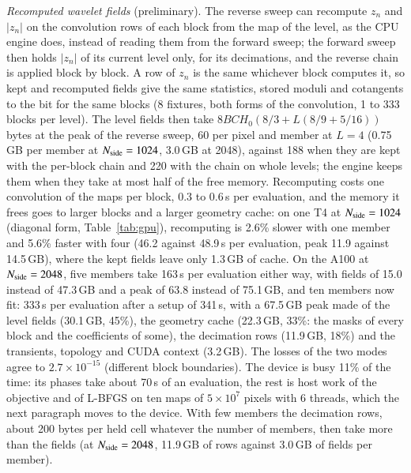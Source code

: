 \documentclass{aa}
\newcommand{\nside}{N_{\rm side}}
\begin{document}
\emph{Recomputed wavelet fields} (preliminary). The reverse sweep can recompute $z_n$ and $|z_n|$ on the convolution rows of each block from the map of the level, as the CPU engine does, instead of reading them from the forward sweep; the forward sweep then holds $|z_n|$ of its current level only, for its decimations, and the reverse chain is applied block by block. A row of $z_n$ is the same whichever block computes it, so kept and recomputed fields give the same statistics, stored moduli and cotangents to the bit for the same blocks (8 fixtures, both forms of the convolution, 1 to 333 blocks per level). The level fields then take $8BCH_0(8/3+L(8/9+5/16))$ bytes at the peak of the reverse sweep, 60 per pixel and member at $L=4$ (0.75\,GB per member at $\nside=1024$, 3.0\,GB at 2048), against 188 when they are kept with the per-block chain and 220 with the chain on whole levels; the engine keeps them when they take at most half of the free memory. Recomputing costs one convolution of the maps per block, 0.3 to 0.6\,s per evaluation, and the memory it frees goes to larger blocks and a larger geometry cache: on one T4 at $\nside=1024$ (diagonal form, Table~\ref{tab:gpu}), recomputing is 2.6\% slower with one member and 5.6\% faster with four (46.2 against 48.9\,s per evaluation, peak 11.9 against 14.5\,GB), where the kept fields leave only 1.3\,GB of cache. On the A100 at $\nside=2048$, five members take 163\,s per evaluation either way, with fields of 15.0 instead of 47.3\,GB and a peak of 63.8 instead of 75.1\,GB, and ten members now fit: 333\,s per evaluation after a setup of 341\,s, with a 67.5\,GB peak made of the level fields (30.1\,GB, 45\%), the geometry cache (22.3\,GB, 33\%: the masks of every block and the coefficients of some), the decimation rows (11.9\,GB, 18\%) and the transients, topology and CUDA context (3.2\,GB). The losses of the two modes agree to $2.7\times10^{-15}$ (different block boundaries). The device is busy 11\% of the time: its phases take about 70\,s of an evaluation, the rest is host work of the objective and of L-BFGS on ten maps of $5\times10^7$ pixels with 6 threads, which the next paragraph moves to the device. With few members the decimation rows, about 200 bytes per held cell whatever the number of members, then take more than the fields (at $\nside=2048$, 11.9\,GB of rows against 3.0\,GB of fields per member).
\end{document}
